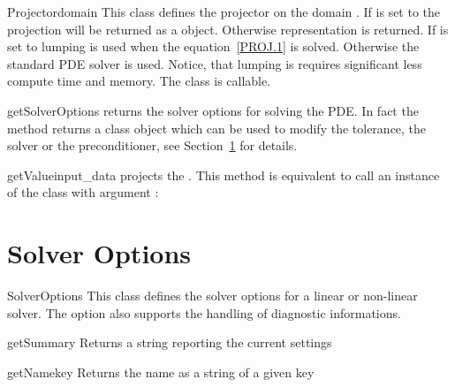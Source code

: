 \begin{classdesc}{Projector}{domain}
This class defines the projector on the domain . 
If  is set to \True the projection will be returned  
as a \ReducedSolutionFS \Data object. Otherwise \SolutionFS representation is returned. 
If  is set to \True lumping is used when 
the equation~\ref{PROJ.1} is solved. Otherwise the standard 
PDE solver is used. Notice, that lumping is requires significant less 
compute time and memory. The class is callable.
\end{classdesc}

\begin{methoddesc}[Projector]{getSolverOptions}{}
returns the solver options for solving the PDE. In fact the method returns
a \SolverOptions class object which can be used to modify the tolerance, 
the solver or the preconditioner, see Section~\ref{SEC Solver Options} for details.
\end{methoddesc}

\begin{methoddesc}[Projector]{getValue}{input_data}
projects the . This method is equivalent to call an instance 
of the class with argument :

\end{methoddesc}



\section{Solver Options}
\label{SEC Solver Options}

\begin{classdesc}{SolverOptions}{}
This class defines the solver options for a linear or non-linear solver.
The option also supports the handling of diagnostic informations. 
\end{classdesc}

\begin{methoddesc}[SolverOptions]{getSummary}{}
Returns a string reporting the current settings
\end{methoddesc}

\begin{methoddesc}[SolverOptions]{getName}{key}
Returns the name as a string of a given key
\end{methoddesc}

